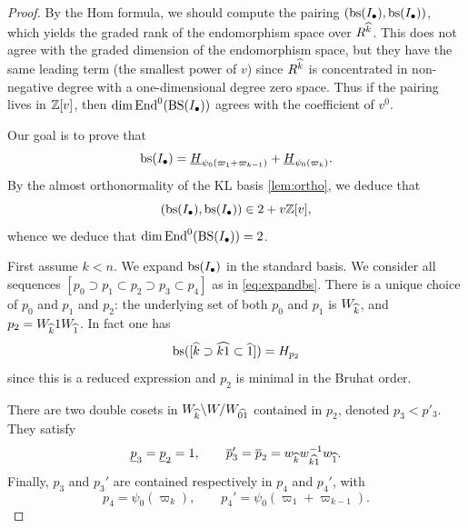 \begin{proof}
By the Hom formula, we should compute the pairing $(\operatorname{bs}(I_{\bullet}), \operatorname{bs}(I_{\bullet}))$, which yields the graded rank of the endomorphism space over $R^{\widehat{k}}$. This does not agree with the graded dimension of the endomorphism space, but they have the same leading term (the smallest power of $v$) since $R^{\widehat{k}}$ is concentrated in non-negative degree with a one-dimensional degree zero space. Thus if the pairing lives in $\mathbb{Z}[v]$, then $\dim \operatorname{End}^0(\operatorname{BS}(I_{\bullet}))$ agrees with the coefficient of $v^0$.

Our goal is to prove that
\begin{equation} \label{dim2bsdecomp} \operatorname{bs}(I_{\bullet}) = \underline{H}_{\psi_0(\varpi_1 + \varpi_{k-1})} + \underline{H}_{\psi_0(\varpi_k)}. \end{equation}
By the almost orthonormality of the KL basis \cref{lem:ortho}, we deduce that 
\[ (\operatorname{bs}(I_{\bullet}), \operatorname{bs}(I_{\bullet})) \in 2 + v \mathbb{Z}[v], \]
whence we deduce that $\dim \operatorname{End}^0(\operatorname{BS}(I_{\bullet})) = 2$.

First assume $k < n$. We expand $\operatorname{bs}(I_{\bullet})$ in the standard basis. We consider all sequences $[p_0 \supset p_1 \subset p_2 \supset p_3 \subset p_4]$ as in \eqref{eq:expandbs}. There is a unique choice of $p_0$ and $p_1$ and $p_2$: the underlying set of both $p_0$ and $p_1$ is $W_{\widehat{k}}$, and $p_2 = W_{\widehat{k}} 1 W_{\widehat{1}}$. In fact one has
\begin{equation} \operatorname{bs}([\widehat{k} \supset \widehat{k1} \subset \widehat{1}]) = H_{p_2} \end{equation}
since this is a reduced expression and $p_2$ is minimal in the Bruhat order.

There are two double cosets in $W_{\widehat{k}}\backslash W /W_{\widehat{01}}$ contained in $p_2$, denoted $p_3 < p'_3$. They satisfy
\begin{equation} \underline{p}_3 = \underline{p}_2 = 1, \qquad \overline{p}_3' = \overline{p}_2 = w_{\widehat{k}} w_{\widehat{k1}}^{-1} w_{\widehat{1}}. \end{equation} 
Finally, $p_3$ and $p_3'$ are contained respectively in $p_4$ and $p_4'$, with
\begin{equation} p_4 = \psi_0(\varpi_{k}), \qquad p_4' = \psi_0(\varpi_1 + \varpi_{k-1}). \end{equation}


\end{proof}

